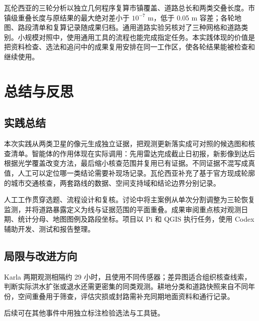 瓦伦西亚的三轮分析以独立几何程序复算市镇覆盖、道路总长和两类交叠长度。市镇级重叠长度与原结果的最大绝对差小于 $10^{-7}$ m，低于 0.05 m 容差；各轮地图、路段清单和复算记录随成果归档。通用道路实验另核对了三种网格和道路类别。小规模对照中，使用通用工具的流程也能完成指定任务。本实践体现的价值是把资料检查、选法和追问中的成果复用安排在同一工作区，使各轮结果能被检查和继续使用。

\section{总结与反思}
\subsection{实践总结}
本次实践从两类卫星的像元生成独立证据，把观测更新落实成可对照的候选图和核查清单。智能体的作用体现在实际调用：先用雷达完成截止日初报，新影像到达后根据光学覆盖改变方法，最后缩小核查范围并复用已有证据。不同证据不混写成真值，人工可以定位哪一类结论需要补现场记录。瓦伦西亚补充了基于官方现成轮廓的城市交通核查，两套路线的数据、空间支持域和结论边界分别记录。

人工工作贯穿选题、流程设计和复核。讨论中将主案例从单次分割调整为三轮恢复监测，并将道路暴露定义为线与证据范围的平面重叠。成果审阅重点核对观测日期、统计分母、地图图例及路段坐标。项目以 Pi 和 QGIS 执行任务，使用 Codex 辅助开发、测试和报告整理。

\subsection{局限与改进方向}
Karla 两期观测相隔约 29 小时，且使用不同传感器；差异图适合组织核查线索，判断实际洪水扩张或退水还需更密集的同类观测。耕地分类和道路快照来自不同年份，空间重叠用于筛查，评估灾损或封路需补充同期地面资料和通行记录。

后续可在其他事件中用独立标注检验选法与工具链。
